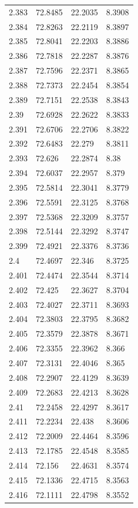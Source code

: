 \begin{tabular}{llll}
2.383 & 72.8485 & 22.2035 & 8.3908 \\
2.384 & 72.8263 & 22.2119 & 8.3897 \\
2.385 & 72.8041 & 22.2203 & 8.3886 \\
2.386 & 72.7818 & 22.2287 & 8.3876 \\
2.387 & 72.7596 & 22.2371 & 8.3865 \\
2.388 & 72.7373 & 22.2454 & 8.3854 \\
2.389 & 72.7151 & 22.2538 & 8.3843 \\
2.39 & 72.6928 & 22.2622 & 8.3833 \\
2.391 & 72.6706 & 22.2706 & 8.3822 \\
2.392 & 72.6483 & 22.279 & 8.3811 \\
2.393 & 72.626 & 22.2874 & 8.38 \\
2.394 & 72.6037 & 22.2957 & 8.379 \\
2.395 & 72.5814 & 22.3041 & 8.3779 \\
2.396 & 72.5591 & 22.3125 & 8.3768 \\
2.397 & 72.5368 & 22.3209 & 8.3757 \\
2.398 & 72.5144 & 22.3292 & 8.3747 \\
2.399 & 72.4921 & 22.3376 & 8.3736 \\
2.4 & 72.4697 & 22.346 & 8.3725 \\
2.401 & 72.4474 & 22.3544 & 8.3714 \\
2.402 & 72.425 & 22.3627 & 8.3704 \\
2.403 & 72.4027 & 22.3711 & 8.3693 \\
2.404 & 72.3803 & 22.3795 & 8.3682 \\
2.405 & 72.3579 & 22.3878 & 8.3671 \\
2.406 & 72.3355 & 22.3962 & 8.366 \\
2.407 & 72.3131 & 22.4046 & 8.365 \\
2.408 & 72.2907 & 22.4129 & 8.3639 \\
2.409 & 72.2683 & 22.4213 & 8.3628 \\
2.41 & 72.2458 & 22.4297 & 8.3617 \\
2.411 & 72.2234 & 22.438 & 8.3606 \\
2.412 & 72.2009 & 22.4464 & 8.3596 \\
2.413 & 72.1785 & 22.4548 & 8.3585 \\
2.414 & 72.156 & 22.4631 & 8.3574 \\
2.415 & 72.1336 & 22.4715 & 8.3563 \\
2.416 & 72.1111 & 22.4798 & 8.3552 \\

\end{tabular}
